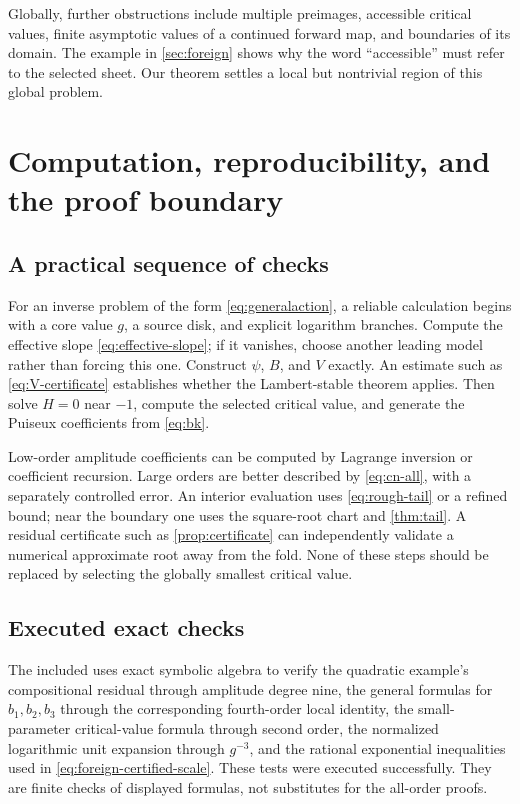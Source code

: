 \documentclass[11pt,a4paper]{article}
\numberwithin{equation}{section}
\theoremstyle{definition}
\theoremstyle{remark}
\begin{document}
Globally, further obstructions include multiple preimages, accessible critical values, finite asymptotic values of a continued forward map, and boundaries of its domain. The example in \cref{sec:foreign} shows why the word ``accessible'' must refer to the selected sheet. Our theorem settles a local but nontrivial region of this global problem.

\section{Computation, reproducibility, and the proof boundary}
\label{sec:computation}
\subsection{A practical sequence of checks}
For an inverse problem of the form \eqref{eq:generalaction}, a reliable calculation begins with a core value $g$, a source disk, and explicit logarithm branches. Compute the effective slope \eqref{eq:effective-slope}; if it vanishes, choose another leading model rather than forcing this one. Construct $\psi$, $B$, and $V$ exactly. An estimate such as \eqref{eq:V-certificate} establishes whether the Lambert-stable theorem applies. Then solve $H=0$ near $-1$, compute the selected critical value, and generate the Puiseux coefficients from \eqref{eq:bk}.

Low-order amplitude coefficients can be computed by Lagrange inversion or coefficient recursion. Large orders are better described by \eqref{eq:cn-all}, with a separately controlled error. An interior evaluation uses \eqref{eq:rough-tail} or a refined bound; near the boundary one uses the square-root chart and \cref{thm:tail}. A residual certificate such as \cref{prop:certificate} can independently validate a numerical approximate root away from the fold. None of these steps should be replaced by selecting the globally smallest critical value.

\subsection{Executed exact checks}
The included  uses exact symbolic algebra to verify the quadratic example's compositional residual through amplitude degree nine, the general formulas for $b_1,b_2,b_3$ through the corresponding fourth-order local identity, the small-parameter critical-value formula through second order, the normalized logarithmic unit expansion through $g^{-3}$, and the rational exponential inequalities used in \eqref{eq:foreign-certified-scale}. These tests were executed successfully. They are finite checks of displayed formulas, not substitutes for the all-order proofs.
\end{document}
